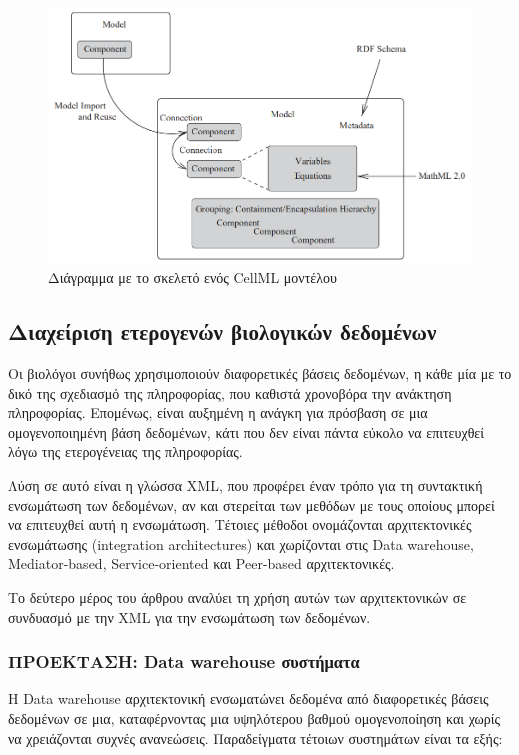             \begin{figure}[ht] \noindent\centering
                \includegraphics[scale=0.7]{img/CellML structure}
                \caption{Διάγραμμα με το σκελετό ενός CellML μοντέλου \cite{CellML}}
            \end{figure}


    \subsection{Διαχείριση ετερογενών βιολογικών δεδομένων}
        Οι βιολόγοι συνήθως χρησιμοποιούν διαφορετικές βάσεις δεδομένων, η κάθε μία με το δικό της σχεδιασμό της πληροφορίας, που καθιστά χρονοβόρα την ανάκτηση πληροφορίας.
        Επομένως, είναι αυξημένη η ανάγκη για πρόσβαση σε μια ομογενοποιημένη βάση δεδομένων, κάτι που δεν είναι πάντα εύκολο να επιτευχθεί λόγω της ετερογένειας της πληροφορίας.

        Λύση σε αυτό είναι η γλώσσα XML, που προφέρει έναν τρόπο για τη συντακτική ενσωμάτωση των δεδομένων, αν και στερείται των μεθόδων με τους οποίους μπορεί να επιτευχθεί αυτή η ενσωμάτωση.
        Τέτοιες μέθοδοι ονομάζονται αρχιτεκτονικές ενσωμάτωσης (integration architectures) και χωρίζονται στις Data warehouse, Mediator-based, Service-oriented και Peer-based αρχιτεκτονικές.

        Το δεύτερο μέρος του άρθρου αναλύει τη χρήση αυτών των αρχιτεκτονικών σε συνδυασμό με την XML για την ενσωμάτωση των δεδομένων.

        \subsubsection{ΠΡΟΕΚΤΑΣΗ: Data warehouse συστήματα}
        Η Data warehouse αρχιτεκτονική ενσωματώνει δεδομένα από διαφορετικές βάσεις δεδομένων σε μια, καταφέρνοντας μια υψηλότερου βαθμού ομογενοποίηση και χωρίς να χρειάζονται συχνές ανανεώσεις.
        Παραδείγματα τέτοιων συστημάτων είναι τα εξής:

